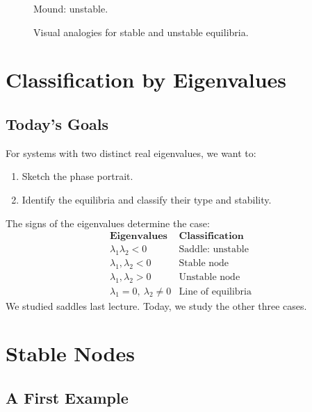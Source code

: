 \documentclass[10pt,letterpaper]{article}
\begin{document}
\begin{figure}[H]
\begin{minipage}[t]{0.32\linewidth}
\small Mound: unstable.
\end{minipage}

\caption{Visual analogies for stable and unstable equilibria.}
\end{figure}

\section{Classification by Eigenvalues}

\subsection{Today's Goals}

For systems with two distinct real eigenvalues,
we want to:
\begin{enumerate}
    \item Sketch the phase portrait.
    \item Identify the equilibria and classify their
    type and stability.
\end{enumerate}

The signs of the eigenvalues determine the case:
\[
\begin{array}{c|l}
\textbf{Eigenvalues} & \textbf{Classification}\\
\hline
\lambda_1\lambda_2<0 & \text{Saddle: unstable}\\
\lambda_1,\lambda_2<0 & \text{Stable node}\\
\lambda_1,\lambda_2>0 & \text{Unstable node}\\
\lambda_1=0,\ \lambda_2\ne0 & \text{Line of equilibria}
\end{array}
\]
We studied saddles last lecture. Today, we study
the other three cases.

\section{Stable Nodes}

\subsection{A First Example}
\end{document}
